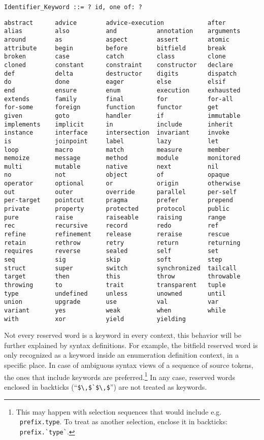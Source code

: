 \syntax\begin{lstlisting}[deletekeywords={of}]
Identifier_Keyword ::= ? id, one of: ?
\end{lstlisting}
\begin{lstlisting}
abstract      advice        advice-execution            after
alias         also          and           annotation    arguments
around        as            aspect        assert        atomic
attribute     begin         before        bitfield      break
broken        case          catch         class         clone
cloned        constant      constraint    constructor   declare
def           delta         destructor    digits        dispatch
do            done          eager         else          elsif
end           ensure        enum          execution     exhausted
extends       family        final         for           for-all
for-some      foreign       function      functor       get
given         goto          handler       if            immutable
implements    implicit      in            include       inherit
instance      interface     intersection  invariant     invoke
is            joinpoint     label         lazy          let
loop          macro         match         measure       member
memoize       message       method        module        monitored
multi         mutable       native        next          nil
no            not           object        of            opaque
operator      optional      or            origin        otherwise
out           outer         override      parallel      per-self
per-target    pointcut      pragma        prefer        prepend
private       property      protected     protocol      public
pure          raise         raiseable     raising       range
rec           recursive     record        redo          ref
refine        refinement    release       reraise       rescue
retain        rethrow       retry         return        returning
requires      reverse       sealed        self          set
seq           sig           skip          soft          step
struct        super         switch        synchronized  tailcall
target        then          this          throw         throwable
throwing      to            trait         transparent   tuple
type          undefined     unless        unowned       until
union         upgrade       use           val           var
variant       yes           weak          when          while
with          xor           yield         yielding
\end{lstlisting}

Not every reserved word is a keyword in every context, this behavior will be further explained by syntax definitions. For example, the bitfield reserved word is only recognized as a keyword inside an enumeration definition context, in a specific place. In case of ambiguous syntax views of a sequence of source tokens, the ones that include keywords are preferred.\footnote{This may happen with selection sequences that would include e.g. ~\lstinline!prefix.type!. To treat  as another selection, enclose it in backticks: ~\lstinline[deletekeywords={type}]!prefix.`type`!.} In any case, reserved words enclosed in backticks (``\lstinline!$\,$`$\,$!'') are not treated as keywords. 




